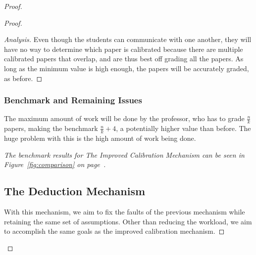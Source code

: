 \documentclass[12pt, Arial]{article}
\begin{document}
\begin{proof}
\begin{proof}
\begin{proof}[Analysis]
Even though the students can communicate with one another, they will have no way to determine which paper is calibrated because there are multiple calibrated papers that overlap, and are thus best off grading all the papers. As long as the minimum value is high enough, the papers will be accurately graded, as before.
\end{proof}
\subsubsection{Benchmark and Remaining Issues}
The maximum amount of work will be done by the professor, who has to grade $\frac{n}{k}$ papers, making the benchmark $\frac{n}{k}+4$, a potentially higher value than before. The huge problem with this is the high amount of work being done.

\emph{The benchmark results for The Improved Calibration Mechanism can be seen in Figure~\ref{fig:comparison} on page~\pageref{fig:comparison}.}

\subsection{The Deduction Mechanism}
\label{sec:deduction}
With this mechanism, we aim to fix the faults of the previous mechanism while retaining the same set of assumptions. Other than reducing the workload, we aim to accomplish the same goals as the improved calibration mechanism.

\end{proof}
\end{proof}
\end{document}

